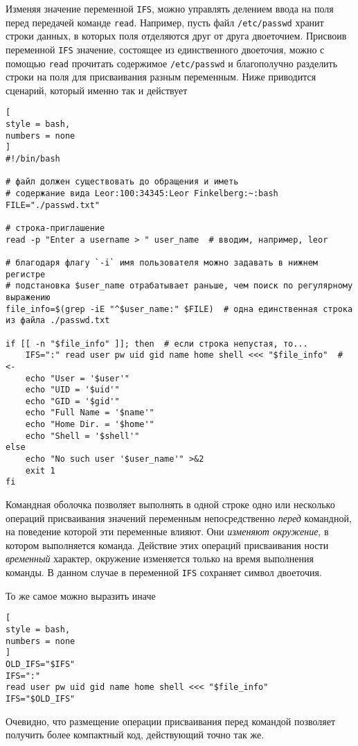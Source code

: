 \documentclass[%
	11pt,
	a4paper,
	utf8,
		]{article}
\begin{document}
Изменяя значение переменной \texttt{IFS}, можно управлять делением ввода на поля перед передачей команде \texttt{read}. Например, пусть файл \verb|/etc/passwd| хранит строки данных, в которых поля отделяются друг от друга двоеточием. Присвоив переменной \texttt{IFS} значение, состоящее из единственного двоеточия, можно с помощью \texttt{read} прочитать содержимое \verb|/etc/passwd| и благополучно разделить строки на поля для присваивания разным переменным. Ниже приводится сценарий, который именно так и действует
\begin{lstlisting}[
style = bash,
numbers = none
]
#!/bin/bash

# файл должен существовать до обращения и иметь
# содержание вида Leor:100:34345:Leor Finkelberg:~:bash
FILE="./passwd.txt"

# строка-приглашение
read -p "Enter a username > " user_name  # вводим, например, leor

# благодаря флагу `-i` имя пользователя можно задавать в нижнем регистре
# подстановка $user_name отрабатывает раньше, чем поиск по регулярному выражению
file_info=$(grep -iE "^$user_name:" $FILE)  # одна единственная строка из файла ./passwd.txt

if [[ -n "$file_info" ]]; then  # если строка непустая, то...
    IFS=":" read user pw uid gid name home shell <<< "$file_info"  # <-
    echo "User = '$user'"
    echo "UID = '$uid'"
    echo "GID = '$gid'"
    echo "Full Name = '$name'"
    echo "Home Dir. = '$home'"
    echo "Shell = '$shell'"
else
    echo "No such user '$user_name'" >&2
    exit 1
fi
\end{lstlisting}

Командная оболочка позволяет выполнять в одной строке одно или несколько операций присваивания значений переменным непосредственно \emph{перед} командной, на поведение которой эти переменные влияют. Они \emph{изменяют окружение}, в котором выполняется команда. Действие этих операций присваивания ности \emph{временный} характер, окружение изменяется только на время выполнения команды. В данном случае в переменной \texttt{IFS} сохраняет символ двоеточия.

То же самое можно выразить иначе
\begin{lstlisting}[
style = bash,
numbers = none
]
OLD_IFS="$IFS"
IFS=":"
read user pw uid gid name home shell <<< "$file_info"
IFS="$OLD_IFS"
\end{lstlisting}

Очевидно, что размещение операции присваивания перед командой позволяет получить более компактный код, действующий точно так же.
\end{document}
